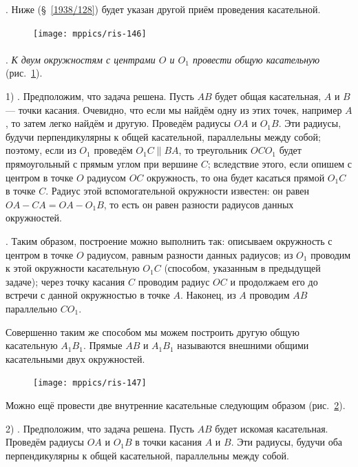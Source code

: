 \documentclass[oneside]{book}
\begin{document}
\smallskip
{}. Ниже (§~\ref{1938/128}) будет указан другой приём проведения касательной.


\begin{figure}
\vskip-3mm
\centering
\texttt{[image: mppics/ris-146]}
\caption{}\label{1938/ris-146}
\end{figure}

\paragraph{}\label{1938/129}
\mbox{.}
\emph{К двум окружностям с центрами $O$ и $O_1$ провести общую касательную} (рис.~\ref{1938/ris-146}).

1) .
Предположим, что задача решена.
Пусть $AB$ будет общая касательная, $A$ и $B$ — точки касания.
Очевидно, что если мы найдём одну из этих точек, например $A$, то затем легко найдём и другую.
Проведём радиусы $OA$ и $O_1B$.
Эти радиусы, будучи перпендикулярны к общей касательной, параллельны между собой;
поэтому, если из $O_1$ проведём $O_1C\parallel BA$, то треугольник $OCO_1$ будет прямоугольный с прямым углом при вершине $C$;
вследствие этого, если опишем с центром в точке $O$ радиусом $OC$ окружность, то она будет касаться прямой $O_1C$ в точке $C$.
Радиус этой вспомогательной окружности известен:
он равен $OA-CA=OA-O_1B$, то есть
он равен разности радиусов данных окружностей.

\smallskip
{}.
Таким образом, построение можно выполнить так:
описываем окружность с центром в точке $O$ радиусом, равным разности данных радиусов;
из $O_1$ проводим к этой окружности касательную $O_1C$ (способом, указанным в предыдущей задаче);
через точку касания $C$ проводим радиус $OC$ и продолжаем его до встречи с данной окружностью в точке $A$.
Наконец, из $A$ проводим $AB$ параллельно $CO_1$.

Совершенно таким же способом мы можем построить другую общую касательную $A_1B_1$.
Прямые $AB$ и $A_1B_1$ называются внешними общими касательными двух окружностей.

\begin{figure}
\centering
\texttt{[image: mppics/ris-147]}
\caption{}\label{1938/ris-147}
\end{figure}

Можно ещё провести две внутренние касательные следующим образом (рис.~\ref{1938/ris-147}).

2) .
Предположим, что задача решена.
Пусть $AB$ будет искомая касательная.
Проведём радиусы $OA$ и $O_1B$ в точки касания $A$ и $B$.
Эти радиусы, будучи оба перпендикулярны к общей касательной, параллельны между собой.
\end{document}
